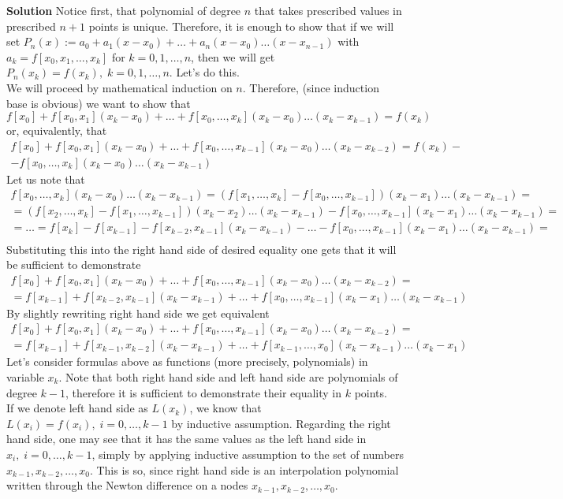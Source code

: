 \documentclass[8pt]{article} %
\newenvironment{solution}%
{\par\textbf{Solution}\space }%
{\par}
\begin{document}
\begin{solution}
	Notice first, that polynomial of degree $n$ that takes prescribed values in prescribed $n+1$ points is unique. Therefore, it is
	enough to show that if we will set $P_n(x):=a_0+a_1(x-x_0)+\dots+a_n(x-x_0)\dots(x-x_{n-1})$ with $a_k=f[x_0,x_1,\dots,x_k]$ for
	$k=0,1,\dots,n$, then we will get $P_n(x_k)=f(x_k),\;k=0,1,\dots,n$. Let's do this.\\
	We will proceed by mathematical induction on $n$. Therefore, (since induction base is obvious) we want to show that
	\[f[x_0]+f[x_0,x_1](x_k-x_0)+\dots+f[x_0,\dots,x_{k}](x_k-x_0)\dots(x_k-x_{k-1})=f(x_k)\]
	or, equivalently, that
	\begin{gather*}
		f[x_0]+f[x_0,x_1](x_k-x_0)+\dots+f[x_0,\dots,x_{k-1}](x_k-x_0)\dots(x_k-x_{k-2})=f(x_k)-\\
		-f[x_0,\dots,x_{k}](x_k-x_0)\dots(x_k-x_{k-1})
	\end{gather*}
	Let us note that
	\begin{gather*}
	f[x_0,\dots,x_{k}](x_k-x_0)\dots(x_k-x_{k-1})=(f[x_1,\dots,x_k]-f[x_0,\dots,x_{k-1}])(x_k-x_1)\dots(x_k-x_{k-1})=\\
	=(f[x_2,\dots,x_{k}]-f[x_1,\dots,x_{k-1}])(x_k-x_2)\dots(x_k-x_{k-1})-f[x_0,\dots,x_{k-1}](x_k-x_1)\dots(x_k-x_{k-1})=\\
	=\dots=f[x_k]-f[x_{k-1}]-f[x_{k-2},x_{k-1}](x_k-x_{k-1})-\dots-f[x_0,\dots,x_{k-1}](x_k-x_1)\dots(x_k-x_{k-1})=\\
	\end{gather*}
	Substituting this into the right hand side of desired equality one gets that it will be sufficient to demonstrate
	\begin{gather*}
		f[x_0]+f[x_0,x_1](x_k-x_0)+\dots+f[x_0,\dots,x_{k-1}](x_k-x_0)\dots(x_k-x_{k-2})=\\
		=f[x_{k-1}]+f[x_{k-2},x_{k-1}](x_k-x_{k-1})+\dots+f[x_0,\dots,x_{k-1}](x_k-x_1)\dots(x_k-x_{k-1})
	\end{gather*}
	By slightly rewriting right hand side we get equivalent
	\begin{gather*}
		f[x_0]+f[x_0,x_1](x_k-x_0)+\dots+f[x_0,\dots,x_{k-1}](x_k-x_0)\dots(x_k-x_{k-2})=\\
		=f[x_{k-1}]+f[x_{k-1},x_{k-2}](x_k-x_{k-1})+\dots+f[x_{k-1},\dots,x_{0}](x_k-x_{k-1})\dots(x_k-x_1)
	\end{gather*}
	Let's consider formulas above as functions (more precisely, polynomials) in variable $x_k$. Note that both right hand side and left hand side
	are polynomials of degree $k-1$, therefore it is sufficient to demonstrate their equality in $k$ points.\\
	If we denote left hand side as $L(x_k)$, we know that $L(x_i)=f(x_i),\;i=0,\dots,k-1$ by inductive assumption. Regarding the right hand side,
	one may see that it has the same values as the left hand side in $x_i,\;i=0,\dots,k-1$, simply by applying inductive assumption to the set of
	numbers $x_{k-1},x_{k-2},\dots,x_0$. This is so, since right hand side is an interpolation polynomial written through the Newton difference
	on a nodes $x_{k-1},x_{k-2},\dots,x_0$.
\end{solution}
\end{document}
